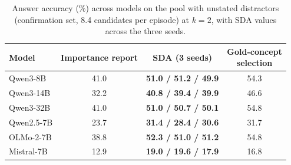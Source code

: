 \begin{table}[t]
\centering
\caption{Answer accuracy (\%) across models on the pool with unstated distractors (confirmation set, 8.4 candidates per
episode) at $k=2$, with SDA values across the three seeds.}
\label{tab:stress}
\small
\setlength{\tabcolsep}{4pt}
\begin{tabular}{lccc}
\toprule
Model & Importance report & \textbf{SDA (3 seeds)} & \shortstack{Gold-concept\\selection} \\
\midrule
Qwen3-8B & 41.0 & \textbf{51.0 / 51.2 / 49.9} & 54.3 \\
Qwen3-14B & 32.2 & \textbf{40.8 / 39.4 / 39.9} & 46.6 \\
Qwen3-32B & 41.0 & \textbf{51.0 / 50.7 / 50.1} & 54.8 \\
Qwen2.5-7B & 23.7 & \textbf{31.4 / 28.4 / 30.6} & 31.7 \\
OLMo-2-7B & 38.8 & \textbf{52.3 / 51.0 / 51.2} & 54.8 \\
Mistral-7B & 12.9 & \textbf{19.0 / 19.6 / 17.9} & 16.8 \\
\bottomrule
\end{tabular}

\end{table}
